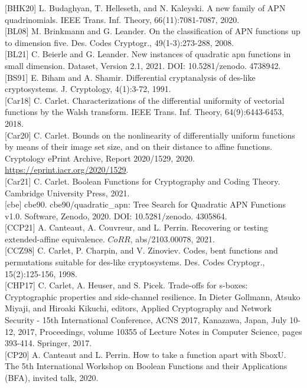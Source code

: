 \documentclass[10pt]{article}
\begin{document}
[BHK20] L. Budaghyan, T. Helleseth, and N. Kaleyski. A new family of APN quadrinomials. IEEE Trans. Inf. Theory, 66(11):7081-7087, 2020.\\[0pt]
[BL08] M. Brinkmann and G. Leander. On the classification of APN functions up to dimension five. Des. Codes Cryptogr., 49(1-3):273-288, 2008.\\[0pt]
[BL21] C. Beierle and G. Leander. New instances of quadratic apn functions in small dimension. Dataset, Version 2.1, 2021. DOI: 10.5281/zenodo. 4738942.\\[0pt]
[BS91] E. Biham and A. Shamir. Differential cryptanalysis of des-like cryptosystems. J. Cryptology, 4(1):3-72, 1991.\\[0pt]
[Car18] C. Carlet. Characterizations of the differential uniformity of vectorial functions by the Walsh transform. IEEE Trans. Inf. Theory, 64(9):6443-6453, 2018.\\[0pt]
[Car20] C. Carlet. Bounds on the nonlinearity of differentially uniform functions by means of their image set size, and on their distance to affine functions. Cryptology ePrint Archive, Report 2020/1529, 2020. \href{https://eprint.iacr.org/2020/1529}{https://eprint.iacr.org/2020/1529}.\\[0pt]
[Car21] C. Carlet. Boolean Functions for Cryptography and Coding Theory. Cambridge University Press, 2021.\\[0pt]
[cbe] cbe90. cbe90/quadratic\_apn: Tree Search for Quadratic APN Functions v1.0. Software, Zenodo, 2020. DOI: 10.5281/zenodo. 4305864.\\[0pt]
[CCP21] A. Canteaut, A. Couvreur, and L. Perrin. Recovering or testing extended-affine equivalence. $C o R R$, abs/2103.00078, 2021.\\[0pt]
[CCZ98] C. Carlet, P. Charpin, and V. Zinoviev. Codes, bent functions and permutations suitable for des-like cryptosystems. Des. Codes Cryptogr., 15(2):125-156, 1998.\\[0pt]
[CHP17] C. Carlet, A. Heuser, and S. Picek. Trade-offs for s-boxes: Cryptographic properties and side-channel resilience. In Dieter Gollmann, Atsuko Miyaji, and Hiroaki Kikuchi, editors, Applied Cryptography and Network Security - 15th International Conference, ACNS 2017, Kanazawa, Japan, July 10-12, 2017, Proceedings, volume 10355 of Lecture Notes in Computer Science, pages 393-414. Springer, 2017.\\[0pt]
[CP20] A. Canteaut and L. Perrin. How to take a function apart with SboxU. The 5th International Workshop on Boolean Functions and their Applications (BFA), invited talk, 2020.\\[0pt]
\end{document}
